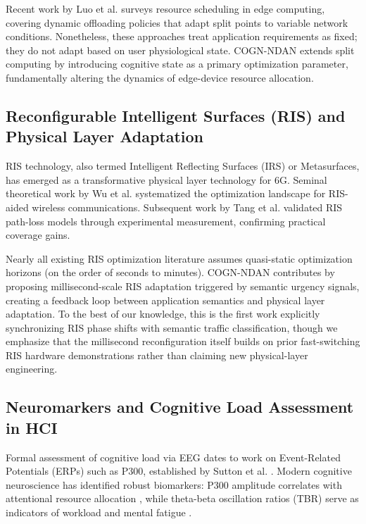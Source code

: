 \documentclass{BVP_CINC}
\newcommand{\COGN}{COGN-NDAN}
\begin{document}
Recent work by Luo et al. \cite{luo2021resource} surveys resource scheduling in edge computing, covering dynamic offloading policies that adapt split points to variable network conditions. Nonetheless, these approaches treat application requirements as fixed; they do not adapt based on user physiological state. \COGN{} extends split computing by introducing cognitive state as a primary optimization parameter, fundamentally altering the dynamics of edge-device resource allocation.

\subsection{Reconfigurable Intelligent Surfaces (RIS) and Physical Layer Adaptation}
RIS technology, also termed Intelligent Reflecting Surfaces (IRS) or Metasurfaces, has emerged as a transformative physical layer technology for 6G. Seminal theoretical work by Wu et al. \cite{wu2021tutorial} systematized the optimization landscape for RIS-aided wireless communications. Subsequent work by Tang et al. \cite{tang2021ris} validated RIS path-loss models through experimental measurement, confirming practical coverage gains.

Nearly all existing RIS optimization literature assumes quasi-static optimization horizons (on the order of seconds to minutes). \COGN{} contributes by proposing millisecond-scale RIS adaptation triggered by semantic urgency signals, creating a feedback loop between application semantics and physical layer adaptation. To the best of our knowledge, this is the first work explicitly synchronizing RIS phase shifts with semantic traffic classification, though we emphasize that the millisecond reconfiguration itself builds on prior fast-switching RIS hardware demonstrations rather than claiming new physical-layer engineering.

\subsection{Neuromarkers and Cognitive Load Assessment in HCI}
Formal assessment of cognitive load via EEG dates to work on Event-Related Potentials (ERPs) such as P300, established by Sutton et al. \cite{sutton1965evoked}. Modern cognitive neuroscience has identified robust biomarkers: P300 amplitude correlates with attentional resource allocation \cite{polich2007}, while theta-beta oscillation ratios (TBR) serve as indicators of workload and mental fatigue \cite{klimesch2012alpha}.
\end{document}
